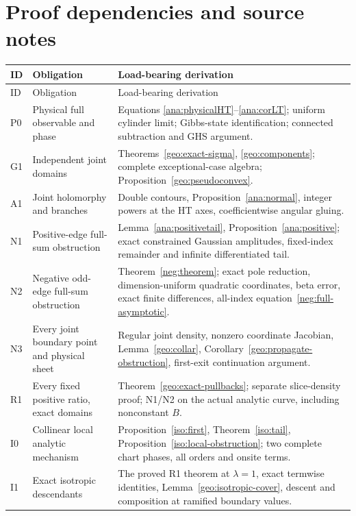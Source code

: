 \documentclass[11pt]{article}
\numberwithin{equation}{section}
\theoremstyle{definition}
\begin{document}
\section{Proof dependencies and source notes}
\label{main:verification}

\begin{longtable}{@{}p{}p{}p{}@{}}
\toprule
ID & Obligation & Load-bearing derivation \\
\midrule
\endfirsthead
\toprule ID & Obligation & Load-bearing derivation \\
\midrule
\endhead
P0 & Physical full observable and phase & Equations
\eqref{ana:physicalHT}--\eqref{ana:corLT}; uniform cylinder limit;
Gibbs-state identification; connected subtraction and GHS argument. \\[3pt]
G1 & Independent joint domains & Theorems~\ref{geo:exact-sigma},
\ref{geo:components}; complete exceptional-case algebra;
Proposition~\ref{geo:pseudoconvex}. \\[3pt]
A1 & Joint holomorphy and branches & Double contours,
Proposition~\ref{ana:normal}, integer powers at the HT axes,
coefficientwise angular gluing. \\[3pt]
N1 & Positive-edge full-sum obstruction & Lemma~\ref{ana:positivetail},
Proposition~\ref{ana:positive}; exact constrained Gaussian amplitudes,
fixed-index remainder and infinite differentiated tail. \\[3pt]
N2 & Negative odd-edge full-sum obstruction &
Theorem~\ref{neg:theorem}; exact pole reduction, dimension-uniform
quadratic coordinates, beta error, exact finite differences,
all-index equation~\eqref{neg:full-asymptotic}. \\[3pt]
N3 & Every joint boundary point and physical sheet &
Regular joint density, nonzero coordinate Jacobian,
Lemma~\ref{geo:collar}, Corollary~\ref{geo:propagate-obstruction},
first-exit continuation argument. \\[3pt]
R1 & Every fixed positive ratio, exact domains &
Theorem~\ref{geo:exact-pullbacks}; separate slice-density proof;
N1/N2 on the actual analytic curve, including nonconstant \(B\). \\[3pt]
I0 & Collinear local analytic mechanism &
Proposition~\ref{iso:first}, Theorem~\ref{iso:tail},
Proposition~\ref{iso:local-obstruction}; two complete chart phases,
all orders and onsite terms. \\[3pt]
I1 & Exact isotropic descendants &
The proved R1 theorem at \(\lambda=1\), exact termwise identities,
Lemma~\ref{geo:isotropic-cover}, descent and composition at
ramified boundary values. \\
\bottomrule
\end{longtable}
\end{document}
